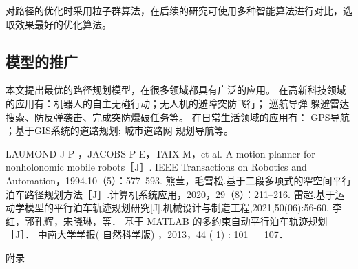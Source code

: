 \documentclass{MathorCupmodeling}
\begin{document}
对路径的优化时采用粒子群算法，在后续的研究可使用多种智能算法进行对比，选取效果最好的优化算法。

\subsection{模型的推广}

本文提出最优的路径规划模型，在很多领域都具有广泛的应用。 在高新科技领域的应用有：机器人的自主无碰行动；无人机的避障突防飞行； 巡航导弹 躲避雷达搜索、防反弹袭击、完成突防爆破任务等。 在日常生活领域的应用有： GPS导航 ；基于GIS系统的道路规划; 城市道路网 规划导航等。





	
	
	
	
	
	
	
	


	\begin{thebibliography}{99}
	LAUMOND J P ，JACOBS P E，TAIX M，et al. A motion planner for nonholonomic mobile robots［J］. IEEE Transactions on Robotics and Automation，1994.10（5）：577–593.
	熊莹，毛雪松.基于二段多项式的窄空间平行泊车路径规划方法［J］.计算机系统应用，2020，29（8）：211–216.
	雷超.基于运动学模型的平行泊车轨迹规划研究[J].机械设计与制造工程,2021,50(06):56-60.
	 李红，郭孔辉，宋晓琳，等． 基于 MATLAB 的多约束自动平行泊车轨迹规划［J］． 中南大学学报( 自然科学版) ，2013，44 ( 1) : 101 － 107． 
	
\end{thebibliography}

	\newpage
	\appendix
	\begin{center}
		\heiti{} 附\hspace{1pc}录
	\end{center}
\end{document}
